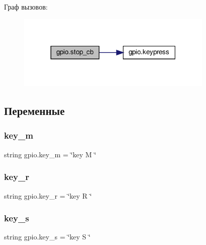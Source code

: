 Граф вызовов\+:\nopagebreak
\begin{figure}[H]
\begin{center}
\leavevmode
\includegraphics[width=265pt]{namespacegpio_a3d6472f268230baafcc5895596b07a6a_cgraph}
\end{center}
\end{figure}


\subsection{Переменные}
\mbox{\label{namespacegpio_af7fb6ee836b3b623fee0a157b4084380}} 
\subsubsection{\texorpdfstring{key\+\_\+m}{key\_m}}
{\footnotesize\ttfamily string gpio.\+key\+\_\+m = \char`\"{}key M \char`\"{}}

\mbox{\label{namespacegpio_acdd7abc8e2ded2f119524bc5e42af82e}} 
\subsubsection{\texorpdfstring{key\+\_\+r}{key\_r}}
{\footnotesize\ttfamily string gpio.\+key\+\_\+r = \char`\"{}key R \char`\"{}}

\mbox{\label{namespacegpio_aab8c27a0b381c11af8ed5c638d612456}} 
\subsubsection{\texorpdfstring{key\+\_\+s}{key\_s}}
{\footnotesize\ttfamily string gpio.\+key\+\_\+s = \char`\"{}key S \char`\"{}}

\mbox{\label{namespacegpio_a6f3cdec53dcabbe77f454382ef596f33}} 
